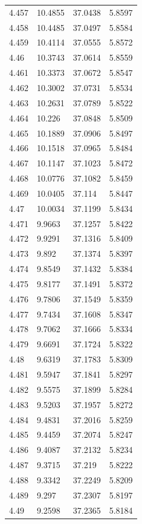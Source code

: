 \begin{tabular}{llll}
4.457 & 10.4855 & 37.0438 & 5.8597 \\
4.458 & 10.4485 & 37.0497 & 5.8584 \\
4.459 & 10.4114 & 37.0555 & 5.8572 \\
4.46 & 10.3743 & 37.0614 & 5.8559 \\
4.461 & 10.3373 & 37.0672 & 5.8547 \\
4.462 & 10.3002 & 37.0731 & 5.8534 \\
4.463 & 10.2631 & 37.0789 & 5.8522 \\
4.464 & 10.226 & 37.0848 & 5.8509 \\
4.465 & 10.1889 & 37.0906 & 5.8497 \\
4.466 & 10.1518 & 37.0965 & 5.8484 \\
4.467 & 10.1147 & 37.1023 & 5.8472 \\
4.468 & 10.0776 & 37.1082 & 5.8459 \\
4.469 & 10.0405 & 37.114 & 5.8447 \\
4.47 & 10.0034 & 37.1199 & 5.8434 \\
4.471 & 9.9663 & 37.1257 & 5.8422 \\
4.472 & 9.9291 & 37.1316 & 5.8409 \\
4.473 & 9.892 & 37.1374 & 5.8397 \\
4.474 & 9.8549 & 37.1432 & 5.8384 \\
4.475 & 9.8177 & 37.1491 & 5.8372 \\
4.476 & 9.7806 & 37.1549 & 5.8359 \\
4.477 & 9.7434 & 37.1608 & 5.8347 \\
4.478 & 9.7062 & 37.1666 & 5.8334 \\
4.479 & 9.6691 & 37.1724 & 5.8322 \\
4.48 & 9.6319 & 37.1783 & 5.8309 \\
4.481 & 9.5947 & 37.1841 & 5.8297 \\
4.482 & 9.5575 & 37.1899 & 5.8284 \\
4.483 & 9.5203 & 37.1957 & 5.8272 \\
4.484 & 9.4831 & 37.2016 & 5.8259 \\
4.485 & 9.4459 & 37.2074 & 5.8247 \\
4.486 & 9.4087 & 37.2132 & 5.8234 \\
4.487 & 9.3715 & 37.219 & 5.8222 \\
4.488 & 9.3342 & 37.2249 & 5.8209 \\
4.489 & 9.297 & 37.2307 & 5.8197 \\
4.49 & 9.2598 & 37.2365 & 5.8184 \\

\end{tabular}
